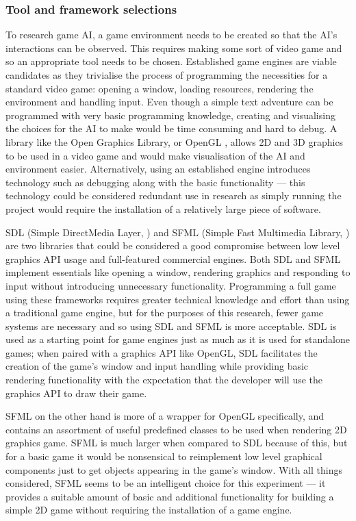 \documentclass[11pt, a4paper]{article}
\begin{document}
\subsubsection{Tool and framework selections}
\label{subsubsec:toolAndFrameworkSelections}

To research game AI, a game environment needs to be created so that the AI's interactions can be observed. This requires making some sort of video game and so an appropriate tool needs to be chosen. Established game engines are viable candidates as they trivialise the process of programming the necessities for a standard video game: opening a window, loading resources, rendering the environment and handling input. Even though a simple text adventure can be programmed with very basic programming knowledge, creating and visualising the choices for the AI to make would be time consuming and hard to debug. A library like the Open Graphics Library, or OpenGL \parencite{OpenGL}, allows 2D and 3D graphics to be used in a video game and would make visualisation of the AI and environment easier. Alternatively, using an established engine introduces technology such as debugging along with the basic functionality --- this technology could be considered redundant use in research as simply running the project would require the installation of a relatively large piece of software.

SDL (Simple DirectMedia Layer, \cite{SDL}) and SFML (Simple Fast Multimedia Library, \cite{SFML}) are two libraries that could be considered a good compromise between low level graphics API usage and full-featured commercial engines. Both SDL and SFML implement essentials like opening a window, rendering graphics and responding to input without introducing unnecessary functionality. Programming a full game using these frameworks requires greater technical knowledge and effort than using a traditional game engine, but for the purposes of this research, fewer game systems are necessary and so using SDL and SFML is more acceptable. SDL is used as a starting point for game engines just as much as it is used for standalone games; when paired with a graphics API like OpenGL, SDL facilitates the creation of the game's window and input handling while providing basic rendering functionality with the expectation that the developer will use the graphics API to draw their game. 

SFML on the other hand is more of a wrapper for OpenGL specifically, and contains an assortment of useful predefined classes to be used when rendering 2D graphics game. SFML is much larger when compared to SDL because of this, but for a basic game it would be nonsensical to reimplement low level graphical components just to get objects appearing in the game's window. With all things considered, SFML seems to be an intelligent choice for this experiment --- it provides a suitable amount of basic and additional functionality for building a simple 2D game without requiring the installation of a game engine.
\end{document}
